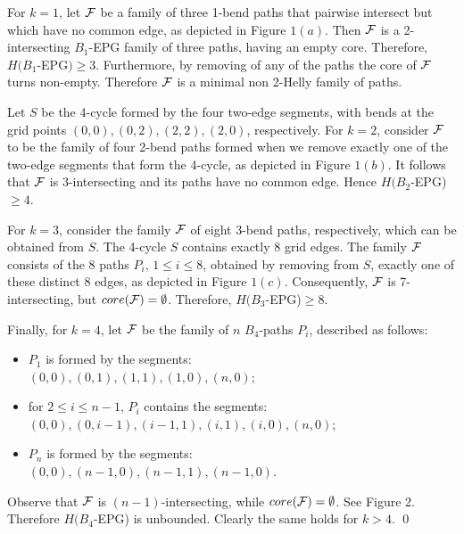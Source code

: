 For $k=1$, let $\cal{F}$ be a family of three 1-bend paths that pairwise intersect but which have no common edge, as depicted in Figure $1 (a)$. 
Then $\cal{F}$ is a  2-intersecting $B_1$-EPG family of three paths, having an empty core. Therefore, $H(B_1$-EPG$) \geq 3$. 
Furthermore, by  removing of any of the paths the core of  $\cal{F}$ turns non-empty. Therefore $\cal{F}$ is a minimal non 2-Helly family of paths.

Let $S$ be the 4-cycle  formed by the four two-edge segments, with bends at the grid points $(0,0),(0,2),(2,2),(2,0)$, respectively.
For $k= 2$,  consider $\cal{F}$ to be the family of four 2-bend paths
formed when we remove exactly one of the two-edge segments that form the 4-cycle,  as depicted in Figure $1 (b)$.
It follows that $\cal{F}$ is 3-intersecting and its paths have no common edge.  Hence $H(B_2$-EPG)$ \geq 4$.

For $k=3$, consider the family $\cal{F}$ of eight  3-bend paths, respectively, which can be obtained from $S$. The 4-cycle $S$ contains exactly 8 grid edges. The  family $\cal{F}$ consists  of the 8 paths $P_i$, $1 \leq i \leq 8$, obtained by removing from $S$, exactly one of these distinct 8 edges, as depicted in Figure $1 (c)$. Consequently, $\cal{F}$ is 7-intersecting, but $core({\cal{F}}) = \emptyset$. Therefore, $H(B_3$-EPG)$\geq 8$.

Finally, for $k = 4$, let $\cal{F}$ be the family of $n$ $B_4$-paths $P_i$, described as follows: 

\begin{itemize}
    \item $P_1$ is formed by the segments: \\ $(0,0),(0,1),(1,1),(1,0),(n,0)$; 

     \item for $2 \leq i \leq n-1$, $P_i$ contains the segments: \\
     $(0,0),(0,i-1),(i-1,1),(i,1),(i,0),(n,0)$;
     
     \item  $P_n$ is formed by the segments: \\ $(0,0),(n-1,0),(n-1,1),(n-1,0).$
     
\end{itemize}     

Observe that $\cal{F}$ is $(n-1)$-intersecting, while $core({\cal{F}})=\emptyset$. See Figure 2. Therefore $H(B_4$-EPG) is unbounded. Clearly the same holds for $k >4$. \qed  



